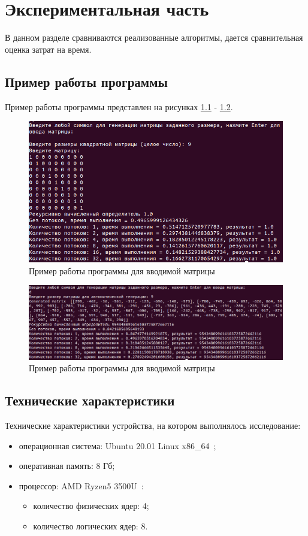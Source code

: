 \documentclass[a4paper,oneside,14pt]{extreport}
\begin{document}
\chapter{Экспериментальная часть}
В данном разделе сравниваются реализованные алгоритмы, дается сравнительная оценка затрат на время.

\section{Пример работы программы}
Пример работы программы представлен на рисунках \ref{fig:input_mat_ex} - \ref{fig:gener_ex}.
\captionsetup{singlelinecheck=true}
\begin{figure}[H]
	\centering
	\includegraphics[width=1\linewidth]{images/input_mat_ex}
	\caption{Пример работы программы для вводимой матрицы}
	\label{fig:input_mat_ex}
\end{figure}

\begin{figure}[H]
	\centering
	\includegraphics[width=1\linewidth]{images/generate_ex}
	\caption{Пример работы программы для вводимой матрицы}
	\label{fig:gener_ex}
\end{figure}


\section{Технические характеристики}
Технические характеристики устройства, на котором выполнялось исследование:
\begin{itemize}
	\item операционная система: Ubuntu 20.01 Linux x86\_64~\cite{ubuntu};
	\item оперативная память: 8 Гб;
	\item процессор: AMD Ryzen5 3500U~\cite{processor}:
	\begin{itemize}
		\item количество физических ядер: 4;
		\item количество логических ядер: 8.
	\end{itemize}
\end{itemize}
\end{document}
